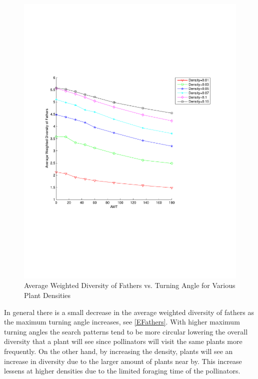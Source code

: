 \begin{figure}
  \begin{center}
  \includegraphics[scale=0.5, trim=0 240 50 300]{WDFvsAMT.pdf}
  \end{center}
  \caption{\small Average Weighted Diversity of Fathers vs. Turning Angle for Various Plant Densities}
  \label{EFathers}
\end{figure}

In general there is a small decrease in the average weighted diversity of fathers as the maximum
turning angle increases, see \autoref{EFathers}. With higher maximum turning angles the search
patterns tend to be more circular lowering the overall diversity that a plant will see since pollinators will visit the same plants more frequently.  On the
other hand, by increasing the density, plants will see an increase in diversity due to the larger
amount of plants near by.  This increase lessens at higher densities due to the limited foraging
time of the pollinators.
